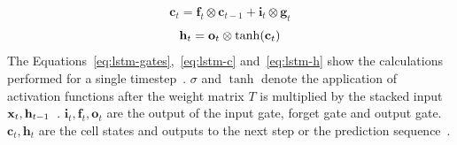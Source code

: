 \begin{equation}\label{eq:lstm-c}
    \textbf{c}_t=\textbf{f}_t\otimes\textbf{c}_{t-1} + \textbf{i}_t\otimes\textbf{g}_t
\end{equation}
\begin{equation}\label{eq:lstm-h}
    \textbf{h}_t=\textbf{o}_t\otimes\tanh(\textbf{c}_t)
\end{equation}
The Equations~\ref{eq:lstm-gates},~\ref{eq:lstm-c} and~\ref{eq:lstm-h} show the calculations
performed for a single timestep~\citep{xu_show_2016}.
$\sigma$ and $\tanh$ denote the application of activation functions after the weight matrix $T$
is multiplied by the stacked input $\textbf{x}_t,\textbf{h}_{t-1}$~\citep{zaremba_recurrent_2015}.
$\textbf{i}_t,\textbf{f}_t,\textbf{o}_t$ are the output of the input gate, forget gate and output
gate.
$\textbf{c}_t,\textbf{h}_t$ are the cell states and outputs to the next step or the
prediction sequence~\citep{zaremba_recurrent_2015}.

